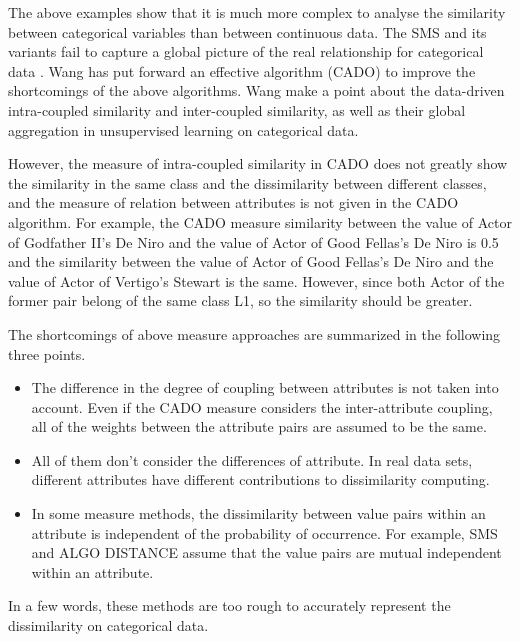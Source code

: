 \documentclass[review]{elsarticle}
\begin{document}
The above examples show that it is much more complex to analyse the similarity between categorical variables than between continuous data. The SMS and its variants fail to capture a global picture of the real relationship for categorical data \cite{WangC2015CADO}. Wang has put forward an effective algorithm \cite{WangC2015CADO} (CADO) to improve the shortcomings of the above algorithms. Wang make a point about the data-driven intra-coupled similarity and inter-coupled similarity, as well as their global aggregation in unsupervised learning on categorical data.

However, the measure of intra-coupled similarity in CADO does not greatly show the similarity in the same class and the dissimilarity between different classes, and the measure of relation between attributes is not given in the CADO algorithm. For example, the CADO measure similarity between the value of Actor of Godfather II's De Niro and the value of Actor of Good Fellas's De Niro is 0.5 and the similarity between the value of Actor of Good Fellas's De Niro and the value of Actor of Vertigo's Stewart is the same. However, since both Actor of the former pair belong of the same class L1, so the similarity should be greater.

The shortcomings of above measure approaches are summarized in the following three points.
\begin{itemize}
  \item The difference in the degree of coupling between attributes is not taken into account. Even if the CADO measure considers the inter-attribute coupling, all of the weights between the attribute pairs are assumed to be the same.
  \item All of them don't consider the differences of attribute. In real data sets, different attributes have different contributions to dissimilarity computing.
  \item In some measure methods, the dissimilarity between value pairs within an attribute is independent of the probability of occurrence. For example, SMS and ALGO DISTANCE assume that the value pairs are mutual independent within an attribute.
 \end{itemize}
 
In a few words, these methods are too rough to accurately represent the dissimilarity on categorical data. 
\end{document}
